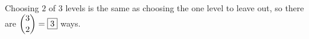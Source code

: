 Choosing $2$ of $3$ levels is the same as choosing the one level to leave out, so there are $\dbinom32=\boxed{3}$ ways.
